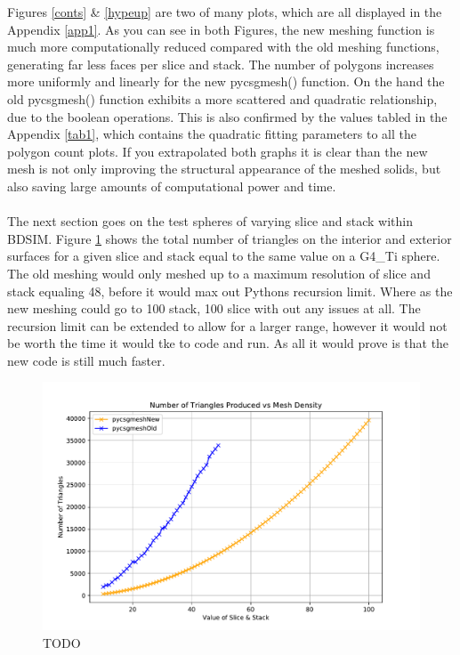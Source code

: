\documentclass[12pt,a4paper]{article}
\begin{document}
\newpage
\noindent Figures \ref{conts} \& \ref{hypeup} are two of many plots, which are all displayed in the Appendix \ref{app1}. As you can see in  both Figures, the new meshing function is much more computationally reduced compared with the old meshing functions, generating far less faces per slice and stack. The number of polygons increases more uniformly and linearly for the new pycsgmesh() function. On the hand the old pycsgmesh() function exhibits a more scattered and quadratic relationship, due to the boolean operations. This is also confirmed by the values tabled in the Appendix \ref{tab1}, which contains the quadratic fitting parameters to all the polygon count plots. If you extrapolated both graphs it is clear than the new mesh is not only improving the structural appearance of the meshed solids, but also saving large amounts of computational power and time.
\\\\
\label{recur}
\noindent The next section goes on the test spheres of varying slice and stack within BDSIM. Figure \ref{tritri} shows the total number of triangles on the interior and exterior surfaces for a given slice and stack equal to the same value on a G4\_Ti sphere. The old meshing would only meshed up to a maximum resolution of slice and stack equaling 48, before it would max out Pythons recursion limit. Where as the new meshing could go to 100 stack, 100 slice with out any issues at all. The recursion limit can be extended to allow for a larger range, however it would not be worth the time it would tke to code and run. As all it would prove is that the new code is still much faster. 

\begin{figure}[h!]
\centering
\includegraphics[scale=0.5]{Images//Triangles//MeshvTRi1.pdf}
\caption[width=\columnwidth]{TODO}
\label{tritri}
\end{figure}
\end{document}
